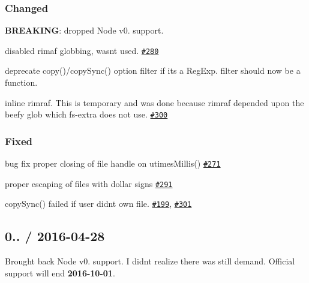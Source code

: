 \subsubsection*{Changed}


\begin{DoxyItemize}
\item {\bfseries B\+R\+E\+A\+K\+I\+NG}\+: dropped Node v0. support.
\item disabled {\ttfamily rimaf} globbing, wasn\textquotesingle{}t used. \href{https://github.com/jprichardson/node-fs-extra/pull/280}{\tt \#280}
\item deprecate {\ttfamily copy()/copy\+Sync()} option {\ttfamily filter} if it\textquotesingle{}s a {\ttfamily Reg\+Exp}. {\ttfamily filter} should now be a function.
\item inline {\ttfamily rimraf}. This is temporary and was done because {\ttfamily rimraf} depended upon the beefy {\ttfamily glob} which {\ttfamily fs-\/extra} does not use. \href{https://github.com/jprichardson/node-fs-extra/pull/300}{\tt \#300}
\end{DoxyItemize}

\subsubsection*{Fixed}


\begin{DoxyItemize}
\item bug fix proper closing of file handle on {\ttfamily utimes\+Millis()} \href{https://github.com/jprichardson/node-fs-extra/issues/271}{\tt \#271}
\item proper escaping of files with dollar signs \href{https://github.com/jprichardson/node-fs-extra/pull/291}{\tt \#291}
\item {\ttfamily copy\+Sync()} failed if user didn\textquotesingle{}t own file. \href{https://github.com/jprichardson/node-fs-extra/issues/199}{\tt \#199}, \href{https://github.com/jprichardson/node-fs-extra/pull/301}{\tt \#301}
\end{DoxyItemize}

\subsection*{0.. / 2016-\/04-\/28 }


\begin{DoxyItemize}
\item Brought back Node v0. support. I didn\textquotesingle{}t realize there was still demand. Official support will end {\bfseries 2016-\/10-\/01}.
\end{DoxyItemize}

